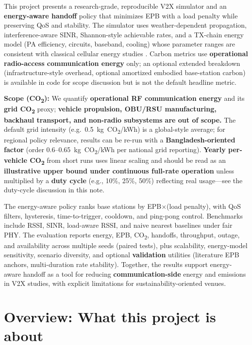 \documentclass[conference]{IEEEtran}
\begin{document}
This project presents a research-grade, reproducible V2X simulator and an \textbf{energy-aware handoff} policy that minimizes EPB with a load penalty while preserving QoS and stability. The simulator uses weather-dependent propagation, interference-aware SINR, Shannon-style achievable rates, and a TX-chain energy model (PA efficiency, circuits, baseband, cooling) whose parameter ranges are consistent with classical cellular energy studies \cite{auer2011howmuch,hasan2011green}. Carbon metrics use \textbf{operational radio-access communication energy} only; an optional extended breakdown (infrastructure-style overhead, optional amortized embodied base-station carbon) is available in code for scope discussion but is not the default headline metric.

\textbf{Scope (CO\textsubscript{2}):} We quantify \textbf{operational RF communication energy} and its \textbf{grid CO\textsubscript{2}} proxy; \textbf{vehicle propulsion, OBU/RSU manufacturing, backhaul transport, and non-radio subsystems are out of scope.} The default grid intensity (e.g.\ 0.5~kg~CO\textsubscript{2}/kWh) is a global-style average; for regional policy relevance, results can be re-run with a \textbf{Bangladesh-oriented factor} (order 0.6--0.65~kg~CO\textsubscript{2}/kWh per national grid reporting). \textbf{Yearly per-vehicle CO\textsubscript{2}} from short runs uses linear scaling and should be read as an \textbf{illustrative upper bound under continuous full-rate operation} unless multiplied by a \textbf{duty cycle} (e.g., 10\%, 25\%, 50\%) reflecting real usage---see the duty-cycle discussion in this note.

The energy-aware policy ranks base stations by EPB$\times$(load penalty), with QoS filters, hysteresis, time-to-trigger, cooldown, and ping-pong control. Benchmarks include RSSI, SINR, load-aware RSSI, and naive nearest baselines under fair PHY. The evaluation reports energy, EPB, CO\textsubscript{2}, handoffs, throughput, outage, and availability across multiple seeds (paired tests), plus scalability, energy-model sensitivity, scenario diversity, and optional \textbf{validation} utilities (literature EPB anchors, multi-duration rate stability). Together, the results support energy-aware handoff as a tool for reducing \textbf{communication-side} energy and emissions in V2X studies, with explicit limitations for sustainability-oriented venues.


\section{Overview: What this project is about}
\end{document}
